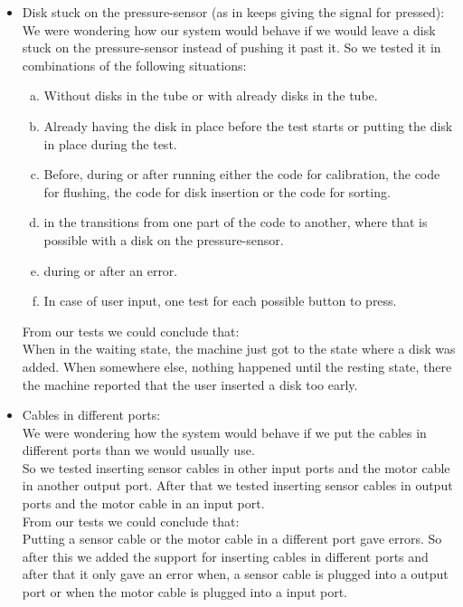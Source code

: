 \begin{itemize}
\item Disk stuck on the pressure-sensor (as in keeps giving the signal for pressed):\\
We were wondering how our system would behave if we would leave a disk stuck on the pressure-sensor instead of pushing it past it. 
So we tested it in combinations of the following situations:
\begin{enumerate}[a.]
  \item Without disks in the tube or with already disks in the tube.
  \item Already having the disk in place before the test starts or putting the disk in place during the test.
  \item Before, during or after running either the code for calibration, the code for flushing, the code for disk insertion or the code for sorting.
  \item in the transitions from one part of the code to another, where that is possible with a disk on the pressure-sensor.
  \item during or after an error.
  \item In case of user input, one test for each possible button to press.
\end{enumerate}
From our tests we could conclude that:\\
When in the waiting state, the machine just got to the state where a disk was added.
When somewhere else, nothing happened until the resting state, there the machine reported that the user inserted a disk too early.\\


\item Cables in different ports:\\
We were wondering how the system would behave if we put the cables in different ports than we would usually use.\\
So we tested inserting sensor cables in other input ports and the motor cable in another output port.
After that we tested inserting sensor cables in output ports and the motor cable in an input port.\\
From our tests we could conclude that:\\
Putting a sensor cable or the motor cable in a different port gave errors. 
So after this we added the support for inserting cables in different ports and after that it only gave an error when, a sensor cable is plugged into a output port or when the motor cable is plugged into a input port.\\



\end{itemize}
